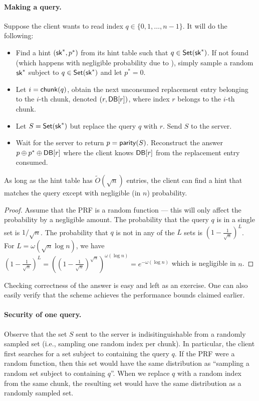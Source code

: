 \paragraph{Making a query.}
Suppose the client wants to read index
$q \in \{0, 1, \ldots, n-1\}$.
It will do the following: 
\begin{itemize}
\item 
Find a hint $({\sf sk}^*, p^*)$
from its hint table such that $q \in {\sf Set}({\sf sk}^*)$.
If not found (which happens
with negligible probability due to ), 
simply sample a random ${\sf sk}^*$ subject to $q \in {\sf Set}({\sf sk}^*)$ and let $p^* =0$.
\item 
Let $i = {\sf chunk}(q)$, obtain the next unconsumed
replacement entry belonging to the $i$-th chunk, denoted $(r, {\sf DB}[r])$,
where index $r$ belongs
to the $i$-th chunk.
\item 
Let $S = {\sf Set}({\sf sk}^*)$ but 
replace the query $q$ with $r$. 
Send $S$ to the server. 
\item 
Wait for the server to return 
$p = {\sf parity}(S)$.
Reconstruct the answer $p \oplus p^* \oplus {\sf DB}[r]$ where the client knows ${\sf DB}[r]$
from the replacement entry consumed.
\end{itemize}

\begin{claim}
As long as the hint table has $\widetilde{O}(\sqrt{n})$ entries,
the client can find a hint that matches the query except with negligible (in $n$)
probability.  
\label{clm:correct}
\end{claim}
\begin{proof}
Assume that the PRF is a random function --- this will only affect
the probability by a negligible amount.
The probability that the query $q$ is in a single set is $1/\sqrt{n}$.
The probability that 
$q$ is not in any of the $L$ sets is $(1-\frac{1}{\sqrt{n}})^L$.
For $L = \omega(\sqrt{n} \log n)$, 
we have 
$(1-\frac{1}{\sqrt{n}})^L = 
\left((1-\frac{1}{\sqrt{n}})^{\sqrt{n}}\right)^{\omega(\log n)} = e^{-\omega(\log n)}$
which is negligible in $n$.
\end{proof}

Checking correctness of the answer is easy and left as an exercise.
One can also easily verify that the scheme achieves the performance
bounds claimed earlier.



\paragraph{Security of one query.}
Observe that the set $S$ sent to the server is indisitinguishable
from a randomly sampled set (i.e., sampling one random index per chunk).  
In particular, the client first searches for a set subject to containing the query $q$.
If the PRF were a random function, then this set would have the same distribution as
``sampling a random set subject to 
containing $q$''.
When we replace $q$ with 
a random index from the same chunk, the resulting set
would have the same distribution as a randomly sampled set.

